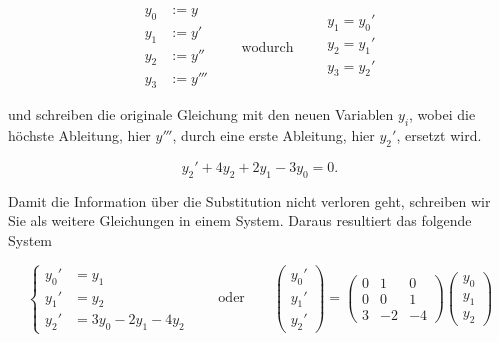 \begin{equation*}
    \begin{aligned}
        y_0 &:= y \\
        y_1 &:= y' \\
        y_2 &:= y'' \\
        y_3 &:= y'''
    \end{aligned} \qquad \text{wodurch} \qquad
    \begin{aligned}
        y_1 = y_0' \\
        y_2 = y_1' \\
        y_3 = y_2' \\
    \end{aligned}
\end{equation*}

\vspace{0.25\baselineskip}

und schreiben die originale Gleichung mit den neuen Variablen \(y_i\), wobei die höchste Ableitung, hier \( y''' \), durch eine erste Ableitung, hier \( y_2' \), ersetzt wird. 

\begin{equation*}
    y_2' + 4y_2 + 2y_1 - 3y_0 = 0.
\end{equation*}

Damit die Information über die Substitution nicht verloren geht, schreiben wir Sie als weitere Gleichungen in einem System. Daraus resultiert das folgende System

\begin{equation*}
    \left\{ \begin{aligned}
        y_0' &= y_1 \\
        y_1' &= y_2 \\
        y_2' &= 3y_0 - 2y_1 -4y_2
    \end{aligned} \right. \qquad \text{oder} \qquad
    \begin{pmatrix}
        y_0' \\
        y_1' \\
        y_2'
    \end{pmatrix} =
    \begin{pmatrix}
        0 & 1 & 0 \\
        0 & 0 & 1 \\
        3 & -2 & -4
    \end{pmatrix}
    \begin{pmatrix}
        y_0 \\
        y_1 \\
        y_2
    \end{pmatrix} 
\end{equation*}

